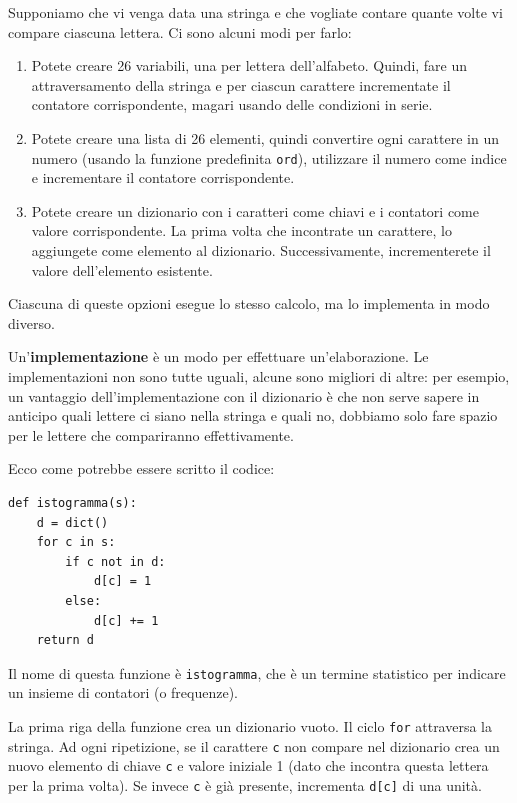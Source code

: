 \documentclass[10pt]{book}
\begin{document}
Supponiamo che vi venga data una stringa e che vogliate contare quante volte vi compare ciascuna lettera. Ci sono alcuni modi per farlo:

\begin{enumerate}

\item Potete creare 26 variabili, una per lettera dell'alfabeto. Quindi, fare un attraversamento della stringa e per ciascun carattere incrementate il contatore corrispondente, magari usando delle condizioni in serie.

\item Potete creare una lista di 26 elementi, quindi convertire ogni carattere in un numero (usando la funzione predefinita {\tt ord}), utilizzare il numero come indice e incrementare il contatore corrispondente.

\item Potete creare un dizionario con i caratteri come chiavi e i contatori come valore corrispondente. La prima volta che incontrate un carattere, lo aggiungete come elemento al dizionario. Successivamente, incrementerete il valore dell'elemento esistente.

\end{enumerate}

Ciascuna di queste opzioni esegue lo stesso calcolo, ma lo implementa in modo diverso.

Un'{\bf implementazione} è un modo per effettuare un'elaborazione. Le implementazioni non sono tutte uguali, alcune sono migliori di altre: per esempio, un vantaggio dell'implementazione con il dizionario è che non serve sapere in anticipo quali lettere ci siano nella stringa e quali no, dobbiamo solo fare spazio per le lettere che compariranno effettivamente.

Ecco come potrebbe essere scritto il codice:

\begin{verbatim}
def istogramma(s):
    d = dict()
    for c in s:
        if c not in d:
            d[c] = 1
        else:
            d[c] += 1
    return d
\end{verbatim}
%
Il nome di questa funzione è {\tt istogramma}, che è un termine statistico per indicare un insieme di contatori (o frequenze).

La prima riga della funzione crea un dizionario vuoto. Il ciclo {\tt for}  attraversa la stringa. Ad ogni ripetizione, se il carattere {\tt c} non compare nel dizionario crea un nuovo elemento di chiave {\tt c} e valore iniziale 1 (dato che incontra questa lettera per la prima volta). Se invece {\tt c} è già presente, incrementa {\tt d[c]} di una unità.
\end{document}
